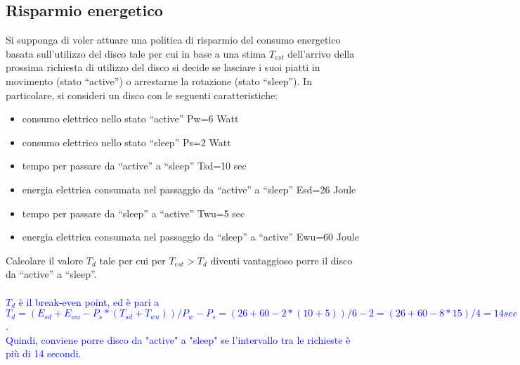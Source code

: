 \documentclass[12pt]{article}
\begin{document}
\subsection{Risparmio energetico}
Si supponga di voler attuare una politica di risparmio del consumo energetico basata sull'utilizzo
del disco tale per cui in base a una stima $T_{est}$ dell'arrivo della prossima richiesta di utilizzo del
disco si decide se lasciare i suoi piatti in movimento (stato “active”) o arrestarne la rotazione (stato
“sleep”).
In particolare, si consideri un disco con le seguenti caratteristiche:
\begin{itemize}
    \item consumo elettrico nello stato “active” Pw=6 Watt
    \item consumo elettrico nello stato “sleep” Ps=2 Watt
    \item tempo per passare da “active” a “sleep” Tsd=10 sec
    \item energia elettrica consumata nel passaggio da “active” a “sleep” Esd=26 Joule
    \item tempo per passare da “sleep” a “active” Twu=5 sec
    \item energia elettrica consumata nel passaggio da “sleep” a “active” Ewu=60 Joule
\end{itemize}
Calcolare il valore $T_d$ tale per cui per $T_{est} > T_d$ diventi vantaggioso porre il disco da “active” a
“sleep”.\\\\
\textcolor{blue}{$T_d$ è il break-even point, ed è pari a $T_d = (E_{sd} + E_{wu} - P_s * (T_{sd} + T_{wu})) / P_w - P_s = (26+60-2*(10+5))/6-2 = (26+60-8*15)/4 = 14 sec$.\\
Quindi, conviene porre disco da "active" a "sleep" se l'intervallo tra le richieste è più di 14 secondi.}
\end{document}
